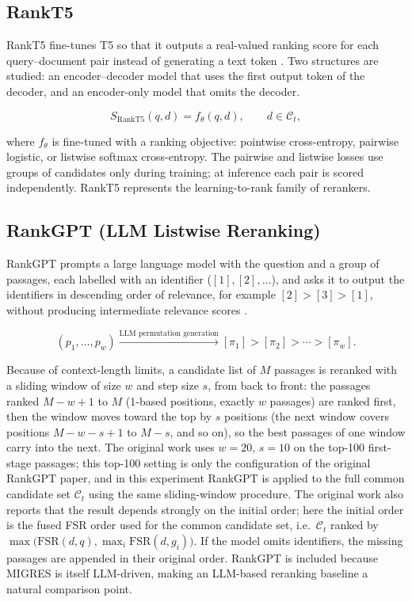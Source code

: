 \documentclass[11pt,a4paper]{article}
\begin{document}
\subsection{RankT5}

RankT5 fine-tunes T5 so that it outputs a real-valued ranking score for each query--document pair instead of generating a text token \citep{zhuang-etal-2023-rankt5}. Two structures are studied: an encoder--decoder model that uses the first output token of the decoder, and an encoder-only model that omits the decoder.

\[
S_{\mathrm{RankT5}}(q,d)
=
f_\theta(q,d),
\qquad d\in\mathcal{C}_t,
\]

where $f_\theta$ is fine-tuned with a ranking objective: pointwise cross-entropy, pairwise logistic, or listwise softmax cross-entropy. The pairwise and listwise losses use groups of candidates only during training; at inference each pair is scored independently. RankT5 represents the learning-to-rank family of rerankers.

\subsection{RankGPT (LLM Listwise Reranking)}

RankGPT prompts a large language model with the question and a group of passages, each labelled with an identifier ($[1],[2],\ldots$), and asks it to output the identifiers in descending order of relevance, for example $[2]>[3]>[1]$, without producing intermediate relevance scores \citep{sun-etal-2023-chatgpt}.

\[
(p_1,\ldots,p_w)
\xrightarrow{\text{LLM permutation generation}}
[\pi_1]>[\pi_2]>\cdots>[\pi_w].
\]

Because of context-length limits, a candidate list of $M$ passages is reranked with a sliding window of size $w$ and step size $s$, from back to front: the passages ranked $M-w+1$ to $M$ (1-based positions, exactly $w$ passages) are ranked first, then the window moves toward the top by $s$ positions (the next window covers positions $M-w-s+1$ to $M-s$, and so on), so the best passages of one window carry into the next. The original work uses $w=20$, $s=10$ on the top-100 first-stage passages; this top-100 setting is only the configuration of the original RankGPT paper, and in this experiment RankGPT is applied to the full common candidate set $\mathcal{C}_t$ using the same sliding-window procedure. The original work also reports that the result depends strongly on the initial order; here the initial order is the fused FSR order used for the common candidate set, i.e.\ $\mathcal{C}_t$ ranked by $\max\big(\mathrm{FSR}(d,q),\max_i \mathrm{FSR}(d,g_i)\big)$. If the model omits identifiers, the missing passages are appended in their original order. RankGPT is included because MIGRES is itself LLM-driven, making an LLM-based reranking baseline a natural comparison point.
\end{document}
